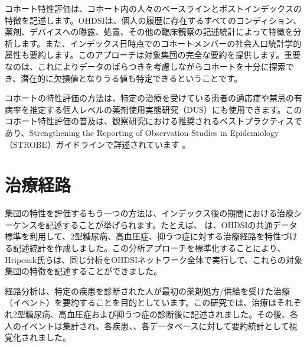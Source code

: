 \documentclass[
  11pt]{book}
\theoremstyle{definition}
\theoremstyle{definition}
\theoremstyle{definition}
\theoremstyle{definition}
\theoremstyle{remark}
\begin{document}
コホート特性評価は、コホート内の人々のベースラインとポストインデックスの特徴を記述します。OHDSIは、個人の履歴に存在するすべてのコンディション、薬剤、デバイスへの曝露、処置、その他の臨床観察の記述統計によって特徴を分析します。また、インデックス日時点でのコホートメンバーの社会人口統計学的属性も要約します。このアプローチは対象集団の完全な要約を提供します。重要なのは、これによりデータのばらつきを考慮しながらコホートを十分に探索でき、潜在的に欠損値となりうる値も特定できるということです。

コホートの特性評価の方法は、特定の治療を受けている患者の適応症や禁忌の有病率を推定する個人レベルの薬剤使用実態研究（DUS）にも使用できます。このコホート特性評価の普及は、観察研究における推奨されるベストプラクティスであり、Strengthening the Reporting of Observation Studies in Epidemiology（STROBE）ガイドラインで詳述されています \citep{VONELM2008344}。  

\section{治療経路}\label{ux6cbbux7642ux7d4cux8def}

集団の特性を評価するもう一つの方法は、インデックス後の期間における治療シーケンスを記述することが挙げられます。たとえば、\citet{Hripcsak7329} は、OHDSIの共通データ標準を利用して、2型糖尿病、高血圧症、抑うつ症に対する治療経路を特性づける記述統計を作成しました。この分析アプローチを標準化することにより、Hripcsak氏らは、同じ分析をOHDSIネットワーク全体で実行して、これらの対象集団の特徴を記述することができました。   

経路分析は、特定の疾患を診断された人が最初の薬剤処方/供給を受けた治療（イベント）を要約することを目的としています。この研究では、治療はそれぞれ2型糖尿病、高血圧症および抑うつ症の診断後に記述されました。その後、各人のイベントは集計され、各疾患、、各データベースに対して要約統計として視覚化されました。
\end{document}
